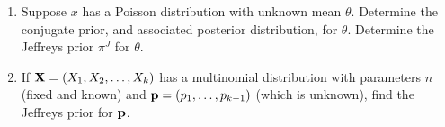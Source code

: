 \documentclass[12pt]{article}
\def\t{\theta}
\begin{document}
\begin{enumerate}
\item Suppose $x$ has a Poisson distribution with unknown mean $\t$.
Determine the conjugate prior, and associated posterior distribution, for $\t$.
Determine the Jeffreys prior $\pi^J$ for $\t$.



\item If ${\bf X}=(X_1,X_2,\ldots, X_k)$ has a
multinomial distribution with parameters $n$ (fixed and known) and ${\bf p}=(p_1, \ldots,
p_{k-1})$ (which is unknown), find the Jeffreys prior for $\bf p$. 




\end{enumerate}
\end{document}
